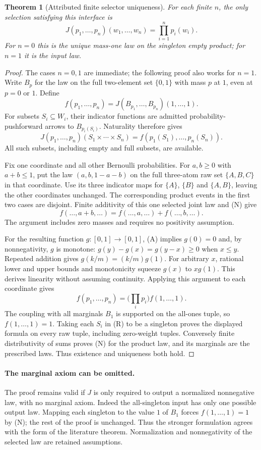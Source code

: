 \documentclass{article}
\newtheorem{theorem}{Theorem}\newtheorem{corollary}[theorem]{Corollary}\newtheorem{proposition}[theorem]{Proposition}
\begin{document}
\begin{theorem}[Attributed finite selector uniqueness]
For each finite $n$, the only selection satisfying this interface is
\[
 J(p_1,\ldots,p_n)(w_1,\ldots,w_n)=\prod_{i=1}^np_i(w_i).
\]
For $n=0$ this is the unique mass-one law on the singleton empty product;
for $n=1$ it is the input law.
\end{theorem}
\begin{proof}
The cases $n=0,1$ are immediate; the following proof also works for $n=1$.
Write $B_p$ for the law on the full two-element set $\{0,1\}$ with
mass $p$ at $1$, even at $p=0$ or $1$. Define
\[
 f(p_1,\ldots,p_n)=J(B_{p_1},\ldots,B_{p_n})(1,\ldots,1).
\]
For subsets $S_i\subseteq W_i$, their indicator functions are admitted
probability-pushforward arrows to $B_{p_i(S_i)}$. Naturality therefore gives
\[
 J(p_1,\ldots,p_n)(S_1\times\cdots\times S_n)
 =f(p_1(S_1),\ldots,p_n(S_n)). \tag{R}
\]
All such subsets, including empty and full subsets, are available.

Fix one coordinate and all other Bernoulli probabilities. For $a,b\geq0$
with $a+b\leq1$, put the law $(a,b,1-a-b)$ on the full three-atom raw set
$\{A,B,C\}$ in that coordinate. Use its three indicator maps for
$\{A\}$, $\{B\}$ and $\{A,B\}$, leaving the other coordinates unchanged.
The corresponding product events in the first two cases are disjoint.
Finite additivity of this one selected joint law and (N) give
\[
 f(\ldots,a+b,\ldots)=f(\ldots,a,\ldots)+f(\ldots,b,\ldots). \tag{A}
\]
The argument includes zero masses and requires no positivity assumption.

For the resulting function $g:[0,1]\to[0,1]$, (A) implies $g(0)=0$
and, by nonnegativity, $g$ is monotone: $g(y)-g(x)=g(y-x)\geq0$ when
$x\leq y$. Repeated addition gives $g(k/m)=(k/m)g(1)$.
For arbitrary $x$, rational lower and upper bounds and monotonicity squeeze
$g(x)$ to $xg(1)$. This derives linearity without assuming continuity.
Applying this argument to each coordinate gives
\[
 f(p_1,\ldots,p_n)=\bigl(\prod_i p_i\bigr)f(1,\ldots,1).
\]
The coupling with all marginals $B_1$ is supported on the all-ones tuple,
so $f(1,\ldots,1)=1$. Taking each $S_i$ in (R) to be a singleton proves
the displayed formula on every raw tuple, including zero-weight tuples.
Conversely finite distributivity of sums proves (N) for the product law,
and its marginals are the prescribed laws. Thus existence and uniqueness
both hold.
\end{proof}

\paragraph{The marginal axiom can be omitted.}
The proof remains valid if $J$ is only required to output a normalized
nonnegative law, with no marginal axiom. Indeed the all-singleton input has
only one possible output law. Mapping each singleton to the value $1$ of
$B_1$ forces $f(1,\ldots,1)=1$ by (N); the rest of the proof is unchanged.
Thus the stronger formulation agrees with the form of the literature theorem.
Normalization and nonnegativity of the selected law are retained assumptions.
\end{document}
